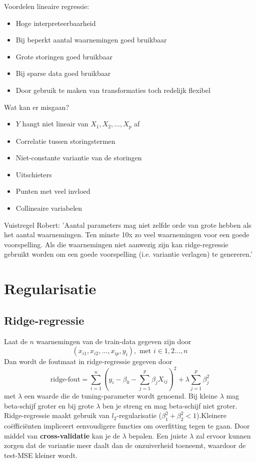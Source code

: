 {\begin{multicols}{2}
\noindent Voordelen lineaire regressie:
\begin{itemize}
    \item Hoge interpreteerbaarheid
    \item Bij beperkt aantal waarnemingen goed bruikbaar
    \item Grote storingen goed bruikbaar
    \item Bij sparse data goed bruikbaar
    \item Door gebruik te maken van transformaties toch redelijk flexibel
\end{itemize}


\noindent Wat kan er misgaan?
\begin{itemize}
    \item $Y$ hangt niet lineair van $X_1, X_2,...,X_p$ af
    \item Correlatie tussen storingstermen
    \item Niet-constante variantie van de storingen
    \item Uitschieters
    \item Punten met veel invloed
    \item Collineaire variabelen
\end{itemize}
\end{multicols}
\noindent Vuistregel Robert: 'Aantal parameters mag niet zelfde orde van grote hebben als het aantal waarnemingen. Ten minste 10x zo veel waarnemingen voor een goede voorspelling. Als die waarnemingen niet aanwezig zijn kan ridge-regressie gebruikt worden om een goede voorspelling (i.e. variantie verlagen) te genereren.'

\section{Regularisatie}
\subsection{Ridge-regressie}
Laat de $n$ waarnemingen van de train-data gegeven zijn door
\[(x_{i1},x_{i2},...,x_{ip},y_i), \textrm{ met } i \in {1,2...,n}\]
Dan wordt de foutmaat in ridge-regressie gegeven door 
\[\textrm{ridge-fout}=\sum\limits_{i=1}^n(y_i-\beta_0-\sum\limits_{j=1}^p\beta_jX_{ij})^2+\lambda\sum\limits_{j=1}^p\beta_j^2\]
met $\lambda$ een waarde die de tuning-parameter wordt genoemd. Bij kleine $\lambda$ mag beta-schijf groter en bij grote $\lambda$ ben je streng en mag beta-schijf niet groter. Ridge-regressie maakt gebruik van $l_2$-regularisatie ($\beta_1^2+\beta_2^2<1$).Kleinere coëfficiënten impliceert eenvoudigere functies om overfitting tegen te gaan. Door middel van \textbf{cross-validatie} kan je de $\lambda$ bepalen. Een juiste $\lambda$ zal ervoor kunnen zorgen dat de variantie meer daalt dan de onzuiverheid toeneemt, waardoor de test-MSE kleiner wordt.\\

}
